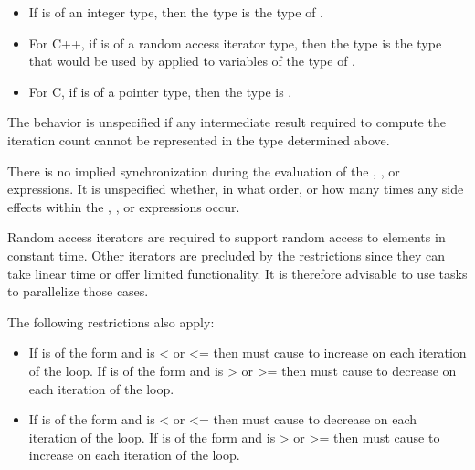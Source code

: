 \begin{ccppspecific}
\begin{itemize}
    \item If  is of an integer type, then the type is the type of .
    
    \item For C++, if  is of a random access iterator type, then the type is the type that 
    would be used by  applied to variables of the type of .
    
    \item For C, if  is of a pointer type, then the type is .
\end{itemize}

The behavior is unspecified if any intermediate result required to compute the iteration 
count cannot be represented in the type determined above.

There is no implied synchronization during the evaluation of the , , or  
expressions. It is unspecified whether, in what order, or how many times any side effects 
within the , , or  expressions occur.

\begin{note}
Random access iterators are required to support random access to elements in 
constant time. Other iterators are precluded by the restrictions since they can take linear 
time or offer limited functionality. It is therefore advisable to use tasks to parallelize 
those cases. 


\end{note}

\restrictions
The following restrictions also apply:

\begin{itemize}
    \item If  is of the form   
     and  is < or <= then  must cause  to increase on each 
    iteration of the loop. If  is of 
    the form    and  
    is > or >= then  must cause  to decrease on each iteration of the loop.
    
    \item If  is of the form   
     and  is < or <= then 
     must cause  to decrease on each iteration of the loop. If  is of 
    the form    and  
    is > or >= then  must cause  to increase on each iteration of the loop.
    

\end{itemize}
\end{ccppspecific}
